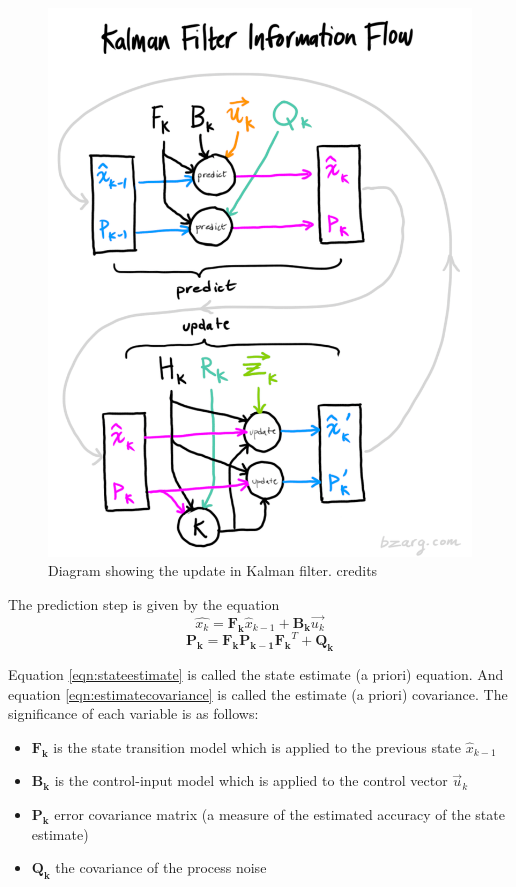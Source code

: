 \documentclass[12pt,twocolumn,letterpaper]{article}
\begin{document}
\begin{figure}
\includegraphics[scale=0.3]{images/kalflow}
\caption{Diagram showing the update in Kalman filter. credits \cite{Bzarg}}
\label{fig:kalmanpredict}
\end{figure}

The prediction step is given by the equation
\begin{equation}
\hat{x_k} = \mathbf{F_k} \hat{x}_{k-1} + \mathbf{B_k} \vec{u_k}
\label{eqn:stateestimate}
\end{equation}
\begin{equation}
\mathbf{P_k} = \mathbf{F_k} \mathbf{P_{k-1}} \mathbf{F_k}^T + \mathbf{Q_k}
\label{eqn:estimatecovariance}
\end{equation}

Equation \ref{eqn:stateestimate} is called the state estimate (a priori) equation. And equation \ref{eqn:estimatecovariance} is called the estimate (a priori) covariance. The significance of each variable is as follows:
\begin{itemize}
\item $\mathbf{F_k}$ is the state transition model which is applied to the previous state $\hat{x}_{k−1}$
\item $\mathbf{B_k}$ is the control-input model which is applied to the control vector $\vec{u}_k$
\item $\mathbf{P_k}$ error covariance matrix (a measure of the estimated accuracy of the state estimate)
\item $\mathbf{Q_k}$ the covariance of the process noise
\end{itemize}
\end{document}
